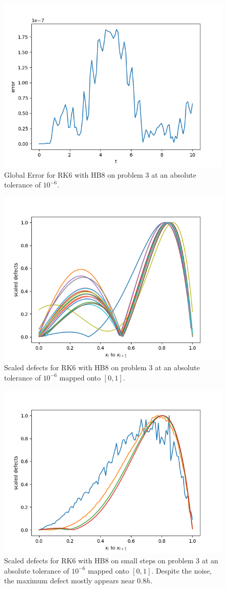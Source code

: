 \begin{figure}[H]
\centering
\includegraphics[width=0.7\linewidth]{./figures/rk6_with_hb8_p3_global_error}
\caption{Global Error for RK6 with HB8 on problem 3 at an absolute tolerance of $10^{-6}$.}
\label{fig:rk6_with_hb8_p3_global_error}
\end{figure}

\begin{figure}[H]
\centering
\includegraphics[width=0.7\linewidth]{./figures/rk6_with_hb8_p3_scaled_defects}
\caption{Scaled defects for RK6 with HB8 on problem 3 at an absolute tolerance of $10^{-6}$ mapped onto $[0, 1]$.}
\label{fig:rk6_with_hb8_p3_scaled_defects}
\end{figure}

\begin{figure}[H]
\centering
\includegraphics[width=0.7\linewidth]{./figures/rk6_with_hb8_p3_scaled_defects_small_steps}
\caption{Scaled defects for RK6 with HB8 on small steps on problem 3 at an absolute tolerance of $10^{-6}$ mapped onto $[0, 1]$. Despite the noise, the maximum defect mostly appears near $0.8h$.}
\label{fig:rk6_with_hb8_p3_scaled_defects_small_steps}
\end{figure}

